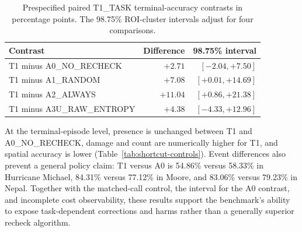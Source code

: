 \begin{table}[htbp]
\centering\small
\caption{Prespecified paired T1\_TASK terminal-accuracy contrasts in percentage points. The 98.75\% ROI-cluster intervals adjust for four comparisons.}
\label{tab:final-contrasts}
\begin{tabular}{lrr}
\toprule
Contrast & Difference & 98.75\% interval\\
\midrule
T1 minus A0\_NO\_RECHECK & $+2.71$ & $[-2.04,+7.50]$\\
T1 minus A1\_RANDOM & $+7.08$ & $[+0.01,+14.69]$\\
T1 minus A2\_ALWAYS & $+11.04$ & $[+0.86,+21.38]$\\
T1 minus A3U\_RAW\_ENTROPY & $+4.38$ & $[-4.33,+12.96]$\\
\bottomrule
\end{tabular}
\end{table}

At the terminal-episode level, presence is unchanged between T1 and A0\_NO\_RECHECK, damage and count are numerically higher for T1, and spatial accuracy is lower (Table~\ref{tab:shortcut-controls}). Event differences also prevent a general policy claim: T1 versus A0 is 54.86\% versus 58.33\% in Hurricane Michael, 84.31\% versus 77.12\% in Moore, and 83.06\% versus 79.23\% in Nepal. Together with the matched-call control, the interval for the A0 contrast, and incomplete cost observability, these results support the benchmark's ability to expose task-dependent corrections and harms rather than a generally superior recheck algorithm.

